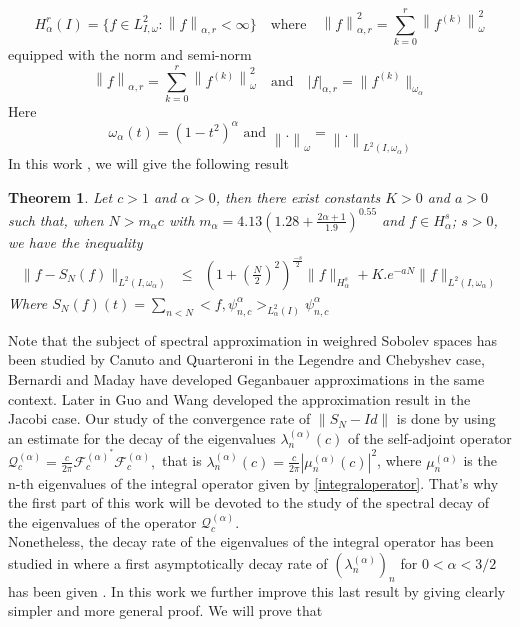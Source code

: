 \documentclass[]{article}
\newtheorem{theorem}{Theorem}
\newcommand\ds{\displaystyle}
\newcommand{\norm}[1]{{\left\|{#1}\right\|}}
\begin{document}
$$  H^r_{\alpha
}(I) = \{f \in L^2_{I,\omega} : \norm{f}_{\alpha, r}<\infty \} \quad
\mbox{where} \quad \norm{f}^2_{\alpha,r} = \displaystyle{\sum_{k=0}^r \norm{f^{(k)}}_{\omega}^2} $$
equipped with the norm and semi-norm
$$\norm{f}_{\alpha,r} = \displaystyle{\sum_{k=0}^r \norm{f^{(k)}}_{\omega}^2} \quad \mbox{and} \quad |f|_{\alpha,r} = \|f^{(k)}\|_{\omega_{\alpha}} $$
Here $$ \omega_\alpha(t) = (1-t^2)^{\alpha} \mbox{ and } \norm{.}_{\omega} = \norm{.}_{L^2(I,\omega_\alpha)} $$
In this work , we will give the following result

\begin{theorem}
	Let $c>1$ and $\alpha  >0$, then there exist constants $K>0$ and $a>0$ such that, when
	$N > m_{\alpha}c$ with $m_{\alpha}=4.13\left(1.28+\frac{2\alpha+1}{1.9}\right)^{0.55}$    and $f \in H^s_{\alpha}$; $s > 0$, we have the inequality
	\begin{eqnarray} \label{ineq}
	\|f-S_N(f)\|_{L^2(I, \omega_{\alpha})} &\leq& \left(1+ \left(\frac{N}{2}\right)^2\right)^{\frac{-s}{2}} \|f\|_{H^s_{\alpha}} +K.e^{-a N}\|f\|_{L^2(I,\omega_{\alpha})}\label{8}
	\end{eqnarray}
	Where $S_N(f)(t)=\ds{\sum_{n<N}}<f,\psi_{n,c}^{\alpha}>_{L^2_{\alpha}(I)}\psi_{n,c}^{\alpha}$
\end{theorem}
Note that the subject of spectral approximation in weighred Sobolev spaces has been studied  by Canuto and Quarteroni \cite{Canuto-Quarteroni} in the Legendre and Chebyshev case, Bernardi and Maday \cite{Bernardi-Maday}have developed Geganbauer approximations in the same context. Later in \cite{Guo-Wang} Guo and Wang developed the approximation result in the Jacobi case.
Our study of the convergence rate of $ \norm{S_N-Id}$ is done by using an estimate for the  decay of the eigenvalues $\lambda^{(\alpha)}_n(c)$ of the self-adjoint  operator ${\displaystyle \mathcal Q_c^{(\alpha)} =\frac{c}{2\pi}  \mathcal F_c^{(\alpha)^*} \mathcal F_c^{(\alpha)},}$ that is
$ \lambda_n^{(\alpha)}(c) = \frac{c}{2\pi}{|\mu_n^{(\alpha)}(c)|^2}$, where   $\mu_n^{(\alpha)}$ is the n-th eigenvalues of the integral operator given by \eqref{integraloperator}.  That's why the first part of this work will be devoted to the study of the spectral decay of the eigenvalues of the  operator ${\displaystyle \mathcal Q_c^{(\alpha)}}$. \\
Nonetheless, the decay rate of the eigenvalues of the integral operator has been studied in \cite{Karoui-Souabni2} where a first asymptotically decay rate of $ (\lambda_n^{(\alpha)})_n $ for $ 0<\alpha<3/2$ has been given . In this work we further improve this last result by giving clearly simpler and more general proof. We will prove that
\end{document}
